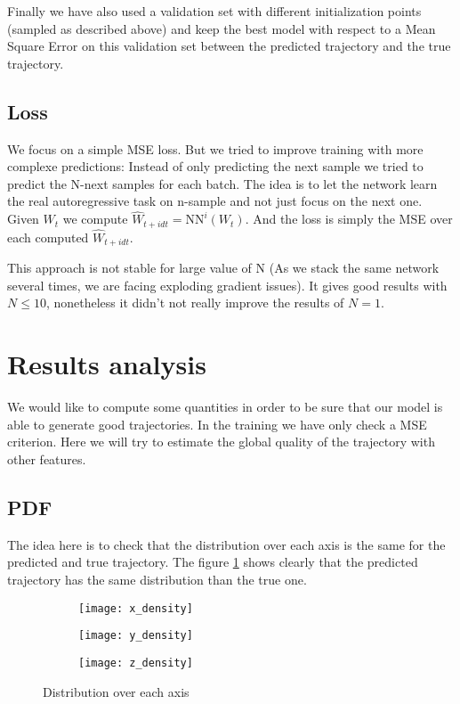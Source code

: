 \documentclass{article}
\begin{document}
Finally we have also used a validation set with different initialization points (sampled as described above) and keep the best model
with respect to a Mean Square Error on this validation set between the predicted trajectory and the true trajectory.

\subsection{Loss}
We focus on a simple MSE loss. But we tried to improve training with more complexe predictions: Instead of only predicting the next sample we tried to
predict the N-next samples for each batch. The idea is to let the network learn the real autoregressive task on n-sample and not just focus on the next
one. Given $W_t$ we compute $\hat{W}_{t + i dt} = \text{NN}^{i}(W_t)$. And the loss is simply the MSE over each computed $\hat{W}_{t + i dt}$.

This approach is not stable for large value of N (As we stack the same network several times, we are facing exploding gradient issues). It
gives good results with $N \le 10$, nonetheless it didn't not really improve the results of $N=1$.

\section{Results analysis}
We would like to compute some quantities in order to be sure that our model is able to generate good trajectories. In the training we have only check
a MSE criterion. Here we will try to estimate the global quality of the trajectory with other features.

\subsection{PDF}
The idea here is to check that the distribution over each axis is the same for the predicted and true trajectory. The figure \ref{fig:pdf} shows clearly
that the predicted trajectory has the same distribution than the true one.

\begin{figure}[h!]
    \centering
    \begin{subfigure}[b]{0.3\linewidth}
        \texttt{[image: x\_density]}
    \end{subfigure}
    \begin{subfigure}[b]{0.3\linewidth}
        \texttt{[image: y\_density]}
    \end{subfigure}
    \begin{subfigure}[b]{0.3\linewidth}
        \texttt{[image: z\_density]}
    \end{subfigure}
    \caption{Distribution over each axis}
    \label{fig:pdf}
\end{figure}
\end{document}
